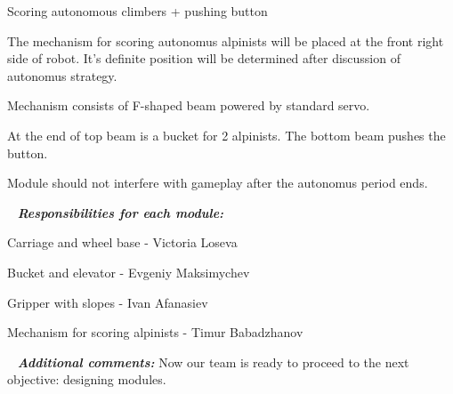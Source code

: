 \begin{enumerate*}
  	  	\item Scoring autonomous climbers + pushing button
  	  	\begin{enumerate*}
  	  		\item The mechanism for scoring autonomus alpinists will be placed at the front right side of robot. It's definite position will be determined after discussion of autonomus strategy.
  	  		
  	  		\item Mechanism consists of F-shaped beam powered by standard servo.
  	  		
  	  		\item At the end of top beam is a bucket for 2 alpinists. The bottom beam pushes the button.
  	  		
  	  		\item Module should not interfere with gameplay after the autonomus period ends.
  	
  \end{enumerate*}
  
   \newline
  \textit{\textbf{Responsibilities for each module:}}
  \begin{enumerate*}
  	\item Carriage and wheel base - Victoria Loseva
  	
  	\item Bucket and elevator - Evgeniy Maksimychev
  	
  	\item Gripper with slopes - Ivan Afanasiev
  	
  	\item Mechanism for scoring alpinists - Timur Babadzhanov
  \end{enumerate*}
\end{enumerate*}
  
   \newline
  \textit{\textbf{Additional comments:}} Now our team is ready to proceed to the next objective: designing modules.

\fillpage

